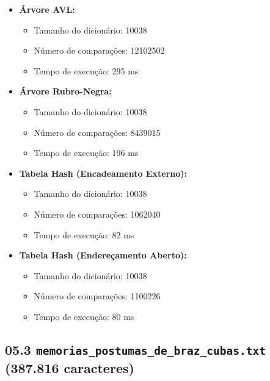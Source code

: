\documentclass{article}
\begin{document}
\begin{itemize}
    \item \textbf{Árvore AVL:}
    \begin{itemize}
        \item Tamanho do dicionário: 10038
        \item Número de comparações: 12102502
        \item Tempo de execução: 295 ms
    \end{itemize}
    
    \item \textbf{Árvore Rubro-Negra:}
    \begin{itemize}
        \item Tamanho do dicionário: 10038
        \item Número de comparações: 8439015
        \item Tempo de execução: 196 ms
    \end{itemize}
    
    \item \textbf{Tabela Hash (Encadeamento Externo):}
    \begin{itemize}
        \item Tamanho do dicionário: 10038
        \item Número de comparações: 1062040
        \item Tempo de execução: 82 ms
    \end{itemize}
    
    \item \textbf{Tabela Hash (Endereçamento Aberto):}
    \begin{itemize}
        \item Tamanho do dicionário: 10038
        \item Número de comparações: 1100226
        \item Tempo de execução: 80 ms
    \end{itemize}
\end{itemize}

\subsection*{05.3 \texttt{memorias\_postumas\_de\_braz\_cubas.txt} (387.816 caracteres)}
\end{document}
